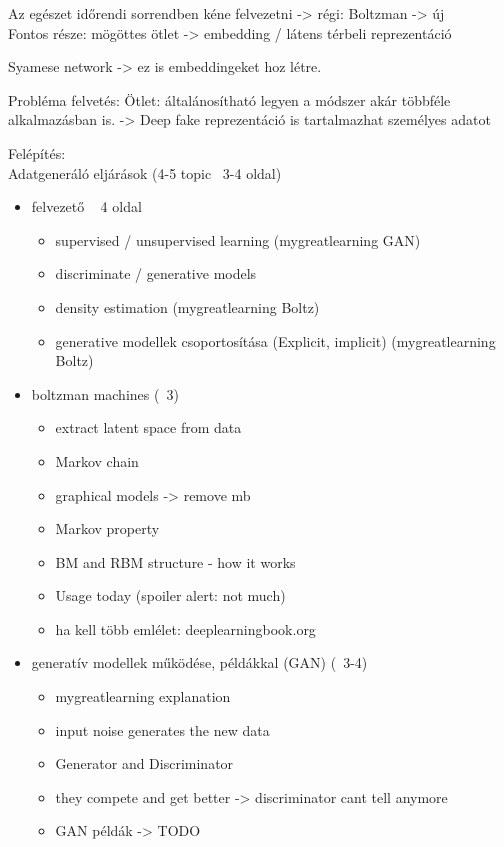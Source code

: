 Az egészet időrendi sorrendben kéne felvezetni -> régi: Boltzman -> új \\
Fontos része: mögöttes ötlet -> embedding / látens térbeli reprezentáció

Syamese network -> ez is embeddingeket hoz létre.

Probléma felvetés:
Ötlet: általánosítható legyen a módszer akár többféle alkalmazásban is. -> Deep fake reprezentáció is tartalmazhat személyes adatot

Felépítés: \\
Adatgeneráló eljárások (4-5 topic ~3-4 oldal)
\begin{itemize}
	\item felvezető ~ 4 oldal 
	\begin{itemize}
		\item supervised / unsupervised learning (mygreatlearning GAN)
		\item discriminate / generative models
		\item density estimation (mygreatlearning Boltz)
		\item generative modellek csoportosítása (Explicit, implicit) (mygreatlearning Boltz)
	\end{itemize}
	\item boltzman machines (~3)
	\begin{itemize}
		\item extract latent space from data
		\item Markov chain
		\item graphical models -> remove mb
		\item Markov property
		\item BM and RBM structure - how it works
		\item Usage today (spoiler alert: not much)
		\item ha kell több emlélet: deeplearningbook.org
	\end{itemize}
	\item generatív modellek működése, példákkal (GAN) (~3-4)
	\begin{itemize}
		\item mygreatlearning explanation
		\item input noise generates the new data
		\item Generator and Discriminator
		\item they compete and get better -> discriminator cant tell anymore
		\item GAN példák -> TODO
	\end{itemize}

\end{itemize}
